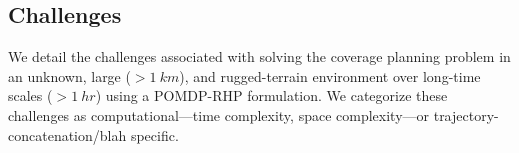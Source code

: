 \documentclass[letterpaper]{article} %
\begin{document}


\subsection{Challenges} \label{ssec:challenges}

    


 
   
We detail the challenges associated with solving the coverage planning problem in an unknown, large ($> 1~km$), and rugged-terrain environment over long-time scales ($> 1~hr$) using a POMDP-RHP formulation. We categorize these challenges as computational---time complexity, space complexity---or trajectory-concatenation/blah specific.
\end{document}
